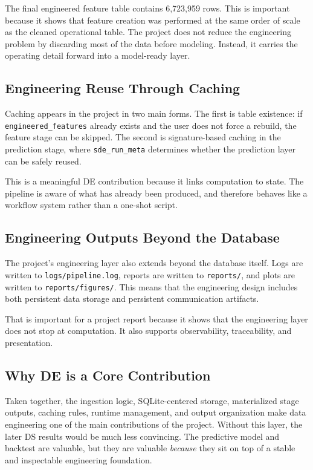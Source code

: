 \documentclass[11pt,a4paper]{article}
\begin{document}
The final engineered feature table contains 6,723,959 rows. This is important
because it shows that feature creation was performed at the same order of scale
as the cleaned operational table. The project does not reduce the engineering
problem by discarding most of the data before modeling. Instead, it carries the
operating detail forward into a model-ready layer.

\subsection{Engineering Reuse Through Caching}

Caching appears in the project in two main forms. The first is table existence:
if \texttt{engineered\_features} already exists and the user does not force a
rebuild, the feature stage can be skipped. The second is signature-based
caching in the prediction stage, where \texttt{sde\_run\_meta} determines
whether the prediction layer can be safely reused.

This is a meaningful DE contribution because it links computation to state. The
pipeline is aware of what has already been produced, and therefore behaves like
a workflow system rather than a one-shot script.

\subsection{Engineering Outputs Beyond the Database}

The project’s engineering layer also extends beyond the database itself. Logs
are written to \texttt{logs/pipeline.log}, reports are written to
\texttt{reports/}, and plots are written to \texttt{reports/figures/}. This
means that the engineering design includes both persistent data storage and
persistent communication artifacts.

That is important for a project report because it shows that the engineering
layer does not stop at computation. It also supports observability,
traceability, and presentation.

\subsection{Why DE is a Core Contribution}

Taken together, the ingestion logic, SQLite-centered storage, materialized stage
outputs, caching rules, runtime management, and output organization make data
engineering one of the main contributions of the project. Without this layer,
the later DS results would be much less convincing. The predictive model and
backtest are valuable, but they are valuable \emph{because} they sit on top of
a stable and inspectable engineering foundation.
\end{document}
